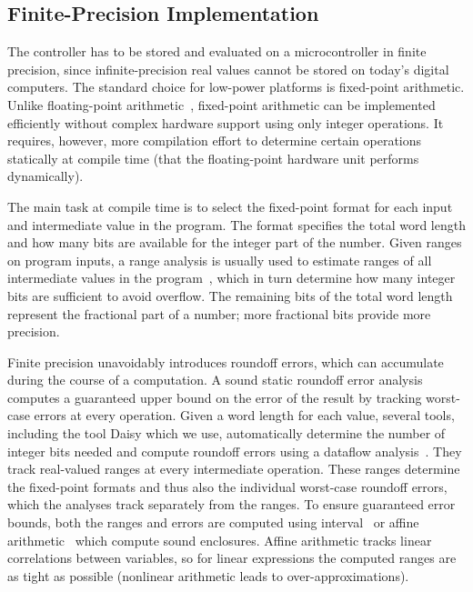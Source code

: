 \subsection{Finite-Precision Implementation}

The controller has to be stored and evaluated on a microcontroller in
finite precision, since infinite-precision real values cannot be stored on
today's digital computers.
The standard choice for low-power platforms is fixed-point arithmetic. Unlike
floating-point arithmetic~\cite{ieee75408}, fixed-point arithmetic can be implemented efficiently
without complex hardware support using only integer operations. It requires,
however, more compilation effort to determine certain operations statically at
compile time (that the floating-point hardware unit performs dynamically).
 
The main task at compile time is to select the fixed-point format for each input and intermediate value
in the program. The format specifies the total word length and how many bits are
available for the integer part of the number. Given ranges on program inputs, a
range analysis is usually used to estimate ranges of all intermediate values in the
program~\cite{Pang2011,Kinsman2009}, which in turn determine how many integer bits are sufficient to
avoid overflow. The remaining bits of the total word length represent the
fractional part of a number; more fractional bits provide more precision. 

Finite precision unavoidably introduces roundoff errors, which can accumulate
during the course of a computation.
A sound static roundoff error analysis computes a guaranteed upper bound on the
error of the result by tracking worst-case errors at every operation. Given a
word length for each value, several tools, including the tool Daisy which we use, automatically determine the number of
integer bits needed and compute roundoff errors using a dataflow analysis~\cite{Daisy,Gappa}.
They track real-valued ranges at every intermediate operation. These ranges
determine the fixed-point formats and thus also the individual worst-case roundoff errors,
which the analyses track separately from the ranges. To ensure guaranteed
error bounds, both the ranges and errors are computed using interval~\cite{intervals} or
affine arithmetic~\cite{affineArithmetic} which compute sound enclosures. 
Affine arithmetic tracks linear correlations between variables, so for linear expressions
the computed ranges are as tight as possible (nonlinear arithmetic
leads to over-approximations).

